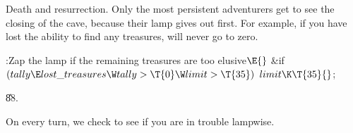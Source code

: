 Death and resurrection. Only the most persistent adventurers get to
see the closing of the cave, because their lamp gives out first.
For example, if you have lost the ability to find any treasures,
 will never go to zero.

\Y\B\4:Zap the lamp if the remaining treasures are too elusive\X${}\E{}$\6
\&{if} ${}(\\{tally}\E\\{lost\_treasures}\W\\{tally}>\T{0}\W\\{limit}>%
\T{35}){}$\1\5
${}\\{limit}\K\T{35}{}$;\2\par
\U88.\fi

On every turn, we check to see if you are in trouble lampwise.

